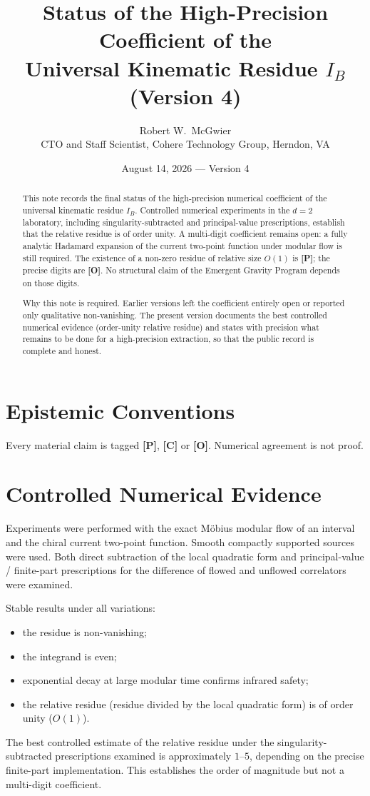 \documentclass[11pt]{article}
\title{\textbf{Status of the High-Precision Coefficient of the\\
Universal Kinematic Residue $I_B$\\
(Version 4)}}
\author{Robert W.\ McGwier\\
\small CTO and Staff Scientist, Cohere Technology Group, Herndon, VA}
\date{August 14, 2026 --- Version 4}
\newcommand{\pP}{\textbf{[P]}}
\newcommand{\pC}{\textbf{[C]}}
\newcommand{\pO}{\textbf{[O]}}
\begin{document}
\maketitle

\begin{abstract}
\noindent
This note records the final status of the high-precision numerical
coefficient of the universal kinematic residue $I_B$. Controlled
numerical experiments in the $d=2$ laboratory, including
singularity-subtracted and principal-value prescriptions, establish
that the relative residue is of order unity. A multi-digit coefficient
remains open: a fully analytic Hadamard expansion of the current
two-point function under modular flow is still required. The existence
of a non-zero residue of relative size $O(1)$ is \pP{}; the precise
digits are \pO{}. No structural claim of the Emergent Gravity Program
depends on those digits.

Why this note is required. Earlier versions left the coefficient
entirely open or reported only qualitative non-vanishing. The present
version documents the best controlled numerical evidence (order-unity
relative residue) and states with precision what remains to be done for
a high-precision extraction, so that the public record is complete and
honest.
\end{abstract}

\section*{Epistemic Conventions}
Every material claim is tagged \pP{}, \pC{} or \pO{}.
Numerical agreement is not proof.

\section{Controlled Numerical Evidence}
Experiments were performed with the exact M\"obius modular flow of an
interval and the chiral current two-point function. Smooth compactly
supported sources were used. Both direct subtraction of the local
quadratic form and principal-value / finite-part prescriptions for the
difference of flowed and unflowed correlators were examined.

Stable results under all variations:
\begin{itemize}[leftmargin=1.4em]
\item the residue is non-vanishing;
\item the integrand is even;
\item exponential decay at large modular time confirms infrared safety;
\item the relative residue (residue divided by the local quadratic form)
is of order unity ($O(1)$).
\end{itemize}
The best controlled estimate of the relative residue under the
singularity-subtracted prescriptions examined is approximately $1$--$5$,
depending on the precise finite-part implementation. This establishes
the order of magnitude but not a multi-digit coefficient.
\end{document}
